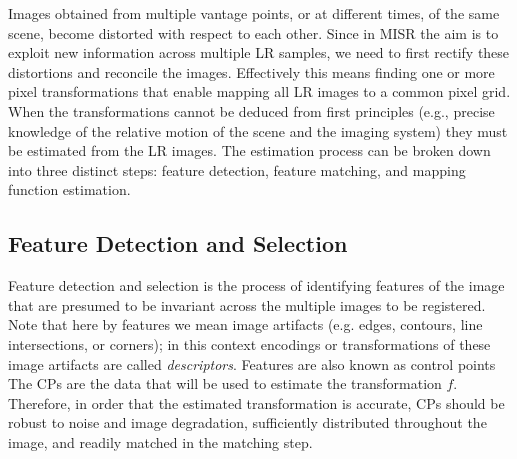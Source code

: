 
Images obtained from multiple vantage points, or at different times, of the same scene, become distorted with respect to each other.
%
Since in MISR the aim is to exploit new information across multiple LR samples, we need to first rectify these distortions and reconcile the images.
%
Effectively this means finding one or more pixel transformations that enable mapping all LR images to a common pixel grid.
%
When the transformations cannot be deduced from first principles (e.g., precise knowledge of the relative motion of the scene and the imaging system) they must be estimated from the LR images.
%
The estimation process can be broken down into three distinct steps: feature detection, feature matching, and mapping function estimation.

\subsection{Feature Detection and Selection}\label{sec:featdetec}

Feature detection and selection is the process of identifying features of the image that are presumed to be invariant across the multiple images to be registered.
%
Note that here by features  we mean image artifacts (e.g. edges, contours, line intersections, or corners); in this context encodings or transformations of these image artifacts are called \textit{descriptors}.
%
Features are also known as control points 
%
The CPs are the data that will be used to estimate the transformation \(f\).
%
Therefore, in order that the estimated transformation is accurate, CPs should be robust to noise and image degradation, sufficiently distributed throughout the image, and readily matched in the matching step.

